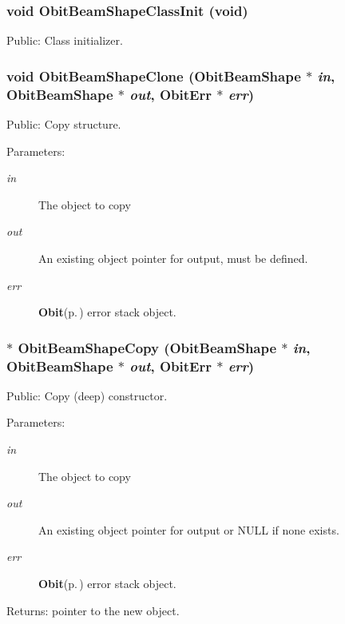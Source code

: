 \subsubsection{\setlength{\rightskip}{0pt plus 5cm}void Obit\-Beam\-Shape\-Class\-Init (void)}\label{ObitBeamShape_8h_a7}


Public: Class initializer. 

\subsubsection{\setlength{\rightskip}{0pt plus 5cm}void Obit\-Beam\-Shape\-Clone ({\bf Obit\-Beam\-Shape} $\ast$ {\em in}, {\bf Obit\-Beam\-Shape} $\ast$ {\em out}, {\bf Obit\-Err} $\ast$ {\em err})}\label{ObitBeamShape_8h_a12}


Public: Copy structure. 

\begin{Desc}
\item[Parameters:]
\begin{description}
\item[{\em in}]The object to copy \item[{\em out}]An existing object pointer for output, must be defined. \item[{\em err}]{\bf Obit}{\rm (p.\,\pageref{structObit})} error stack object. \end{description}
\end{Desc}
\subsubsection{$\ast$ Obit\-Beam\-Shape\-Copy ({\bf Obit\-Beam\-Shape} $\ast$ {\em in}, {\bf Obit\-Beam\-Shape} $\ast$ {\em out}, {\bf Obit\-Err} $\ast$ {\em err})}\label{ObitBeamShape_8h_a11}


Public: Copy (deep) constructor. 

\begin{Desc}
\item[Parameters:]
\begin{description}
\item[{\em in}]The object to copy \item[{\em out}]An existing object pointer for output or NULL if none exists. \item[{\em err}]{\bf Obit}{\rm (p.\,\pageref{structObit})} error stack object. \end{description}
\end{Desc}
\begin{Desc}
\item[Returns:]pointer to the new object. \end{Desc}
